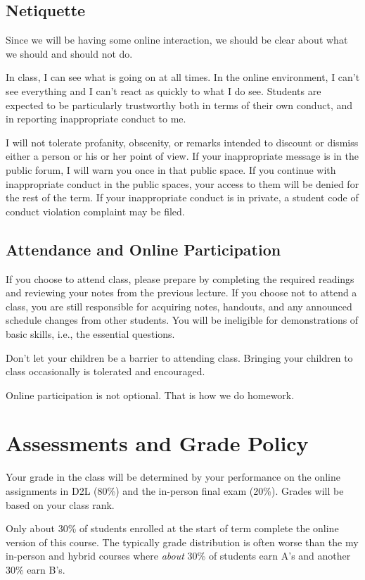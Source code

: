 \documentclass[letterpaper,10pt]{article}
\newif\ifonline
\begin{document}
\subsection{Netiquette}
Since we will be having some online interaction, we should be clear
about what we should and should not do.

In class, I can see what is going on at all times.  In the online
environment, I can't see everything and I can't react as quickly to
what I do see.  Students are expected to be particularly trustworthy
both in terms of their own conduct, and in reporting inappropriate
conduct to me.

I will not tolerate profanity, obscenity, or remarks intended to
discount or dismiss either a person or his or her point of view. If your inappropriate message is in the public forum, I will warn you
once in that public space. If you continue with inappropriate conduct
in the public spaces, your access to them will be denied for the rest
of the term. If your inappropriate
conduct is in private, a student code of conduct violation complaint
may be filed.

 \subsection{Attendance and Online Participation}
 
 If you choose to attend class, please prepare by completing the required readings and reviewing your notes from the previous lecture. If you choose not to attend a class, you are still responsible for acquiring notes, handouts, and any announced schedule changes from other students. You will be ineligible for demonstrations of basic skills, i.e., the essential questions. 
 
 Don’t let your children be a barrier to attending class. Bringing your children to class occasionally is tolerated and encouraged.

Online participation is not optional. That is how we do homework.

\section{Assessments and Grade Policy}

\ifonline
  Your grade in the class will be determined by your performance on the online assignments in D2L (80\%) and the in-person final exam (20\%).  Grades will be based on your class rank.

  Only about 30\% of students enrolled at the start of term complete the online version of this course.  The typically grade distribution is often worse than the my in-person and hybrid courses where \emph{about} 30\% of students earn A's and another 30\% earn B's.
\end{document}
